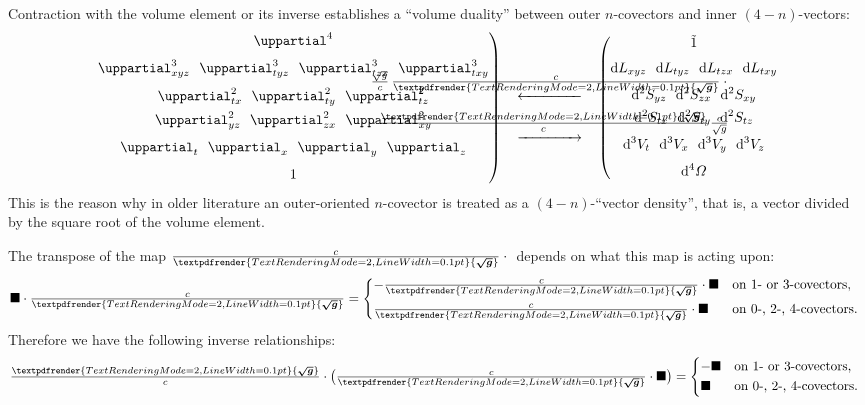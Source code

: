 \documentclass[\ifafour a4paper,12pt,\else a5paper,10pt,\fi%
onecolumn,oneside,article,%
british%
]{memoir}
\theoremstyle{remark}
\theoremstyle{innote}
\renewcommand*{\bm}[1]{\textpdfrender{TextRenderingMode=2,LineWidth=0.1pt}{\boldsymbol{#1}}}
\newcommand*{\de}{\mathop{}\!\uppartial}%
\newcommand*{\di}{\mathop{}\!\mathrm{d}}%
\newcommand*{\dotv}{\blacksquare}%
\renewcommand*{\|}[1][]{\nonscript\:#1\vert\nonscript\:\mathopen{}}
\newcommand*{\se}[1]{\de_{#1}}
\newcommand*{\sse}[1]{\de^{2}_{#1}}
\newcommand*{\ssse}[1]{\de^{3}_{#1}}
\newcommand*{\sssse}[1]{\de^{4}_{#1}}
\newcommand*{\tw}[1]{\tilde{#1}}
\newcommand*{\ti}[1]{\di L_{#1}}
\newcommand*{\tti}[1]{\di^{2}S_{#1}}
\newcommand*{\ttti}[1]{\di^{3}V_{#1}}
\newcommand*{\tttti}[1]{\di^{4}\varOmega_{#1}}
\newcommand*{\dg}{\sqrt{g}}
\newcommand*{\ve}{\tfrac{\bm{\sqrt{g}}}{c}}
\newcommand*{\vi}{\tfrac{c}{\bm{\sqrt{g}}}}
\begin{document}
Contraction with the volume element or its inverse establishes a \enquote{volume duality} between outer $n$-covectors and inner $(4-n)$-vectors:
\begin{equation}
  \label{eq:volume_duality}
  \left.
    \begin{gathered}
      \sssse{}
      \\[\jot]
  \ssse{xyz}\enspace
  \ssse{tyz}\enspace
  \ssse{tzx}\enspace
  \ssse{txy}
  \\[\jot]
  \sse{tx}\enspace
  \sse{ty}\enspace
  \sse{tz}\\
  \sse{yz}\enspace
  \sse{zx}\enspace
  \sse{xy}
  \\[\jot]
  \se{t}\enspace
  \se{x}\enspace
  \se{y}\enspace
  \se{z}
  \\[\jot]
  1
\end{gathered}
\right)\quad
\begin{gathered}
  \xleftarrow{\qquad\mathclap{\textstyle\frac{\dg}{c}\,\vi\cdot{}}\qquad}
  \\
  \xrightarrow{\qquad\mathclap{\textstyle{}\cdot\ve\,\frac{c}{\dg}}\qquad}
\end{gathered}
\quad%
\left(
  \begin{gathered}
    \tw{1}
    \\[\jot]
  \ti{xyz}\enspace
  \ti{tyz}\enspace
  \ti{tzx}\enspace
  \ti{txy}
  \\[\jot]
  \tti{yz}\enspace
  \tti{zx}\enspace
  \tti{xy}\\
  \tti{tx}\enspace
  \tti{ty}\enspace
  \tti{tz}
  \\[\jot]
  \ttti{t}\enspace
  \ttti{x}\enspace
  \ttti{y}\enspace
  \ttti{z}
  \\[\jot]
  \tttti{}
\end{gathered}
\right.
\end{equation}
This is the reason why in older literature an outer-oriented $n$-covector is treated as a $(4-n)$-\enquote{vector density}, that is, a vector divided by the square root of the volume element.

The transpose of the map $\vi\cdot{}$ depends on what this map is acting upon:
\begin{equation}
  \label{eq:transpose_inv_vol_element}
  \dotv\cdot\vi =
  \begin{dcases*}
    -\vi\cdot\dotv& on 1- or 3-covectors,
    \\
    \vi\cdot\dotv& on 0-, 2-, 4-covectors.
  \end{dcases*}
\end{equation}
Therefore we have the following inverse relationships:
\begin{equation}
  \label{eq:inverse_vol_element}
  \ve\cdot\bigl(\vi\cdot \dotv\bigr) =
  \begin{dcases*}
    -\dotv& on 1- or 3-covectors,
    \\
    \dotv& on 0-, 2-, 4-covectors.
  \end{dcases*}
\end{equation}
\end{document}
